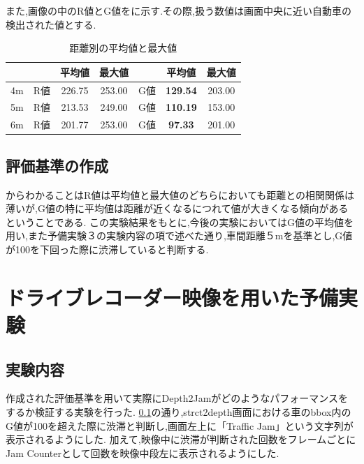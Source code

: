 
また,画像の中のR値とG値をに示す.その際,扱う数値は画面中央に近い自動車の検出された値とする.

\begin{table}[htbp]
  \centering
  \begin{scriptsize}
  \begin{tabular}{ccccccc}
  \toprule
& & 平均値 & 最大値 & & 平均値 & 最大値 \\
  \midrule
4m & R値 & 226.75 & 253.00 & G値 & {\bf129.54} & 203.00 \\
5m & R値 & 213.53 & 249.00 & G値 & {\bf 110.19} & 153.00 \\
6m & R値 & 201.77 & 253.00 & G値 & {\bf 97.33} & 201.00\\
  \bottomrule
  \end{tabular}
  \end{scriptsize}
  \caption{距離別の平均値と最大値}
  \label{tab:mean_max}
\end{table}

\subsection{評価基準の作成}
\label{sec:hyoukakijun}
からわかることはR値は平均値と最大値のどちらにおいても距離との相関関係は薄いが,G値の特に平均値は距離が近くなるにつれて値が大きくなる傾向があるということである.
この実験結果をもとに,今後の実験においてはG値の平均値を用い,また予備実験３の実験内容の項で述べた通り,車間距離５mを基準とし,G値が100を下回った際に渋滞していると判断する.

\section{ドライブレコーダー映像を用いた予備実験}
\subsection{実験内容}
作成された評価基準を用いて実際にDepth2Jamがどのようなパフォーマンスをするか検証する実験を行った.
\ref{sec:hyoukakijun}の通り,strct2depth画面における車のbbox内のG値が100を超えた際に渋滞と判断し,画面左上に「Traffic Jam」という文字列が表示されるようにした.
加えて,映像中に渋滞が判断された回数をフレームごとにJam Counterとして回数を映像中段左に表示されるようにした.

